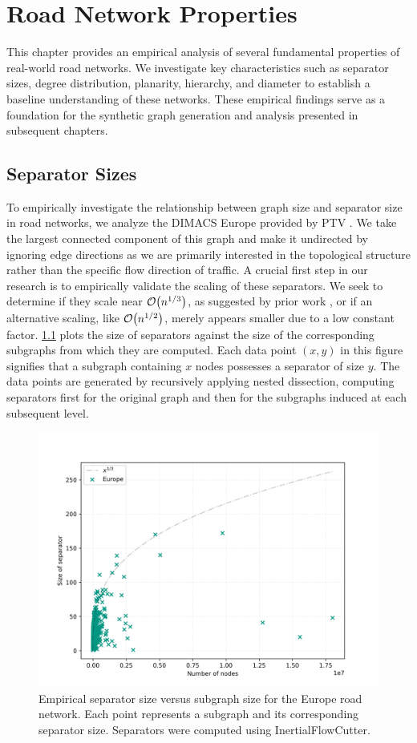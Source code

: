 \chapter{Road Network Properties}
\label{ch:properties}

This chapter provides an empirical analysis of several fundamental properties of real-world road networks.
We investigate key characteristics such as separator sizes, degree distribution, planarity, hierarchy, and diameter to establish a baseline understanding of these networks.
These empirical findings serve as a foundation for the synthetic graph generation and analysis presented in subsequent chapters.

\section{Separator Sizes}
\label{sec:empirical_analysis}

To empirically investigate the relationship between graph size and separator size in road networks, we analyze the DIMACS Europe provided by PTV \cite{ptv_group_dimacs-europe_2009}.
We take the largest connected component of this graph and make it undirected by ignoring edge directions as we are primarily interested in the topological structure rather than the specific flow direction of traffic.
A crucial first step in our research is to empirically validate the scaling of these separators.
We seek to determine if they scale near \(\mathcal{O}\!\left(n^{1/3}\right)\), as suggested by prior work \cite{dibbelt_customizable_2016}, or if an alternative scaling, like \(\mathcal{O}\!\left(n^{1/2}\right)\), merely appears smaller due to a low constant factor.
\cref{fig:separator_size_vs_graph_size} plots the size of separators against the size of the corresponding subgraphs from which they are computed.
Each data point \( (x, y) \) in this figure signifies that a subgraph containing \( x \) nodes possesses a separator of size \( y \).
The data points are generated by recursively applying nested dissection, computing separators first for the original graph and then for the subgraphs induced at each subsequent level.

\begin{figure}[tbhp]
    \centering
    \includegraphics[width=0.7\linewidth]{graphics/Europe.png}
    \caption{Empirical separator size versus subgraph size for the Europe road network. Each point represents a subgraph and its corresponding separator size. Separators were computed using InertialFlowCutter.}
    \label{fig:separator_size_vs_graph_size}
\end{figure}

